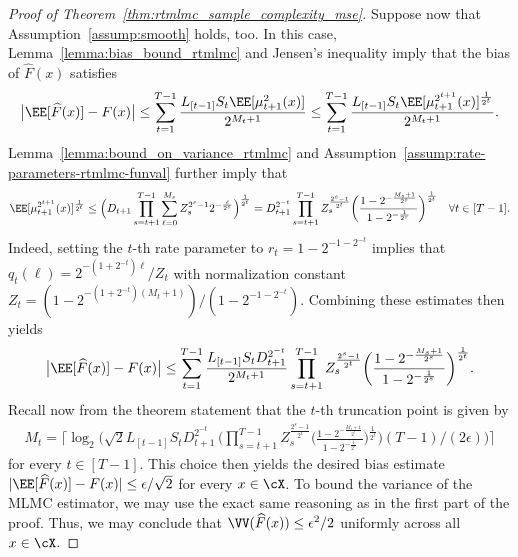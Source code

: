 \documentclass[11pt]{article}
\let\hat\widehat
\begin{document}
\begin{proof}[Proof of Theorem~\ref{thm:rtmlmc_sample_complexity_mse}]
Suppose now that Assumption~\ref{assump:smooth} holds, too. In this case, Lemma~\ref{lemma:bias_bound_rtmlmc} and Jensen's inequality imply that the bias of $\hat F(x)$ satisfies 
\begin{align*}
  \big|\EE[\hat{F}(x)] - F(x)\big| \leq \sum_{t=1}^{T-1}\frac{L_{[t-1]}S_t\EE[\mu_{t+1}^{2}(x)]}{2^{M_t + 1}}  \leq \sum_{t=1}^{T-1}\frac{L_{[t-1]}S_t\EE[\mu_{t+1}^{2^{t+1}}(x)]^\frac{1}{2^t}}{2^{M_t + 1}}.
\end{align*}
Lemma~\ref{lemma:bound_on_variance_rtmlmc} and Assumption~\ref{assump:rate-parameters-rtmlmc-funval} further imply that
\begin{align*}
    \EE[\mu_{t+1}^{2^{t+1}}(x)]^\frac{1}{2^t} \leq \Big(D_{t+1} \prod_{s=t+1}^{T-1}\sum_{\ell=0}^{M_s} Z_s^{2^s-1}2^{-\frac{\ell}{2^s}}\Big)^\frac{1}{2^t}
    =D_{t+1}^{2^{-t}} \prod_{s=t+1}^{T-1} Z_s^{\frac{2^s-1}{2^t}} \bigg(\frac{1-2^{-\frac{M_s+1}{2^s}}}{1-2^{-\frac{1}{2^s}}}\bigg)^\frac{1}{2^t} \quad \forall t\in[T-1].
\end{align*}
Indeed, setting the $t$-th rate parameter to $r_t=1-2^{-1-2^{-t}}$ implies that $q_t(\ell)=2^{-(1+2^{-t})\ell}/Z_t$ with normalization constant $Z_t=(1-2^{-(1+2^{-t})(M_t+1)})/(1-2^{-1-2^{-t}})$. Combining these estimates then yields
\begin{align*}
    \big|\EE[\hat{F}(x)] - F(x)\big| \leq \sum_{t=1}^{T-1}\frac{L_{[t-1]}S_tD_{t+1}^{2^{-t}}}{2^{M_t + 1}} \prod_{s=t+1}^{T-1} Z_s^{\frac{2^s-1}{2^t}} \bigg(\frac{1-2^{-\frac{M_s+1}{2^s}}}{1-2^{-\frac{1}{2^s}}}\bigg)^\frac{1}{2^t}.
\end{align*}
Recall now from the theorem statement that the $t$-th truncation point is given by
\begin{align*}
     \textstyle M_{t}  = \bigg\lceil\log_2\bigg( \sqrt{2}L_{[t-1]}S_{t}D_{t+1}^{2^{-t}} \, \bigg( \prod_{s=t+1}^{T-1}Z_s^{\frac{2^s-1}{2^t}} \Big(\frac{1-2^{-\frac{M_s+1}{2^s}}}{1-2^{-\frac{1}{2^s}}} \Big)^\frac{1}{2^t} \bigg)  (T-1)/(2\epsilon)\bigg)\bigg\rceil
\end{align*}
for every $t\in[T-1]$. This choice then yields the desired bias estimate $|\EE[\hat F(x)]-F(x)|\leq \epsilon/\sqrt{2}$ for every $x\in\cX$. To bound the variance of the MLMC estimator, we may use the exact same reasoning as in the first part of the proof. Thus, we may conclude that $\VV(\hat{F}(x)) \leq \epsilon^2/2$ uniformly across all $x\in\cX$. 


\end{proof}
\end{document}
